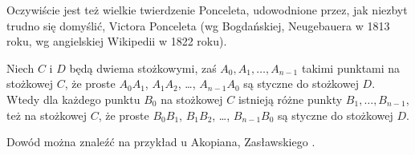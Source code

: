 Oczywiście jest też wielkie twierdzenie Ponceleta, udowodnione przez, jak niezbyt trudno się domyślić, Victora Ponceleta \cite[s. 311-317]{poncelet_1865} (wg Bogdańskiej, Neugebauera w 1813 roku, wg angielskiej Wikipedii w 1822 roku).
%

\begin{theorem}
	Niech $C$ i $D$ będą dwiema stożkowymi, zaś $A_0, A_1, \ldots, A_{n-1}$ takimi punktami na stożkowej $C$, że proste $A_0A_1$, $A_1A_2$, \ldots, $A_{n-1}A_0$ są styczne do stożkowej $D$.
	Wtedy dla każdego punktu $B_0$ na stożkowej $C$ istnieją różne punkty $B_1, \ldots, B_{n-1}$, też na stożkowej $C$, że proste $B_0B_1$, $B_1B_2$, \ldots, $B_{n-1}B_0$ są styczne do stożkowej $D$.
\end{theorem}

Dowód można znaleźć na przykład u Akopiana, Zasławskiego \cite[s. 93, 61, 67, 115, 124]{akopyan_2007}.